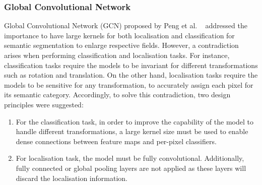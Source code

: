 \subsubsection{Global Convolutional Network}
Global Convolutional Network (GCN) proposed by Peng et al. 
~\cite{Peng2017} addressed the importance to have large kernels for both 
localisation and classification for semantic segmentation to enlarge 
respective fields.
However, a contradiction arises when performing classification and localisation 
tasks. 
For instance, classification tasks require the models to be invariant for 
different transformations such as rotation and translation.
On the other hand, localisation tasks require the models to be sensitive for 
any transformation, to accurately assign each pixel for its semantic category.
Accordingly, to solve this contradiction, two design principles were suggested: 
\begin{enumerate}
	\item For the classification task, in order to improve the capability of 
	the model to handle different transformations, a large kernel size must be 
	used to enable dense connections between feature maps and per-pixel 
	classifiers.
	\item For localisation task, the model must be fully convolutional. 
	Additionally, fully connected or global pooling layers are not applied as 
	these layers will discard the localisation information. 
\end{enumerate}

